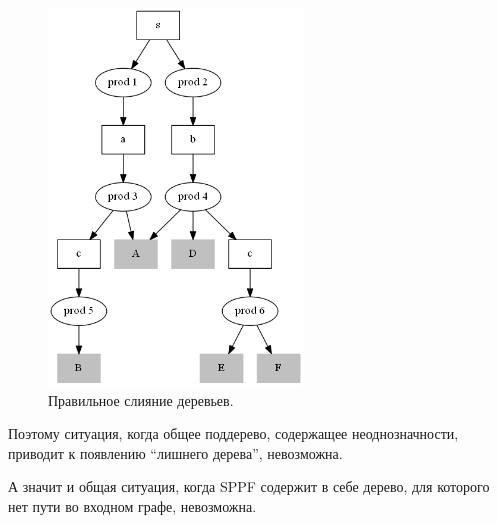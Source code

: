 \begin{figure}[h]
\centering
\includegraphics[height=100mm]{Pictures/SPPF_proof_correct.png}
\caption{Правильное слияние деревьев.}
\label{sppf_proof_correct}
\end{figure}

Поэтому ситуация, когда общее поддерево, содержащее неоднозначности, приводит к появлению “лишнего дерева”, невозможна. 

А значит и общая ситуация, когда SPPF содержит в себе дерево, для которого нет пути во входном графе, невозможна.

